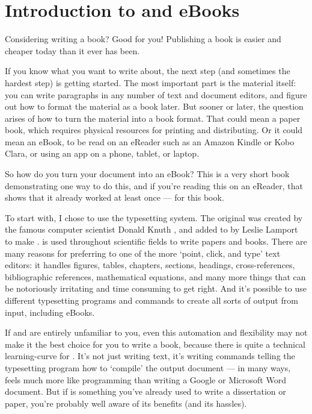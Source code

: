 
\chapter{Introduction to \latex and eBooks}

Considering writing a book? Good for you! Publishing a book is easier and cheaper today 
than it ever has been. 

If you know what you want to write about, the next step (and sometimes the 
hardest step) is getting started. The most important part is the material itself: 
you can write paragraphs in any number of text and document editors, 
and figure out how to format the material as a book later. But sooner or later, 
the question arises of how to turn the material into a book format. That could mean a paper book, 
which requires physical resources for printing and distributing. Or it could mean
an eBook, to be read on an eReader such as an Amazon Kindle or Kobo
Clara, or using an app on a phone, tablet, or laptop.

So how do you turn your document into an eBook? This is a very short book demonstrating one 
way to do this, and if you're reading this on an eReader, that shows
that it already worked at least once --- for this book.

To start with, I chose to use the \latex typesetting system. 
The original \tex was created by the famous computer scientist Donald Knuth \citep{knuth1984texbook},
and added to by Leslie Lamport to make \latex \citep{lamport1985latex}.
\latex is used throughout scientific fields to write papers and books. There are many
reasons for preferring \latex to one of the more `point, click, and type' text editors:
it handles figures, tables, chapters, sections, headings, cross-references, 
bibliographic references, mathematical equations, and many more things that can be 
notoriously irritating and time consuming to get right. And it's possible to use different typesetting
programs and commands to create all sorts of output from \latex input, including eBooks.

If \tex and \latex are entirely unfamiliar to you, even this automation and flexibility 
may not make it the best choice for you to write a book, because there is quite a technical 
learning-curve for \latex. It's not just writing text, it's writing commands telling the
typesetting program how to `compile' the output document --- in many ways, \latex
feels much more like programming than writing a Google or Microsoft Word document. But if
\latex is something you've already used to write a dissertation or paper, you're 
probably well aware of its benefits (and its hassles). 

